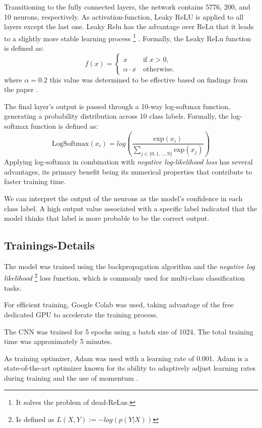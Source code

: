 Transitioning to the fully connected layers, the network contains 5776, 200, and 10 neurons, respectively. As activation-function, Leaky ReLU is applied to all layers except the last one. Leaky Relu has the advantage over ReLu that it leads to a slightly more stable learning process \footnote{It solves the problem of dead-ReLus.} \citep{Maas2013RectifierNI}.
Formally, the Leaky ReLu function is defined as: 
$$
f(x) =
\begin{cases}
x \qquad \ \text{if } x >0, \\ 
\alpha \cdot x \quad \text{otherwise.}
\end{cases}
$$
where $\alpha = 0.2$ this value was determined to be effective based on findings from the paper \citep{xu2015Reluempirical}.

The final layer's output is passed through a 10-way log-softmax function, generating a probability distribution across 10 class labels. Formally, the log-softmax function is defined as: 
$$
\text{LogSoftmax}(x_i) = log(\frac{\text{exp}(x_i)}{\sum_{j \in \{0, 1, ..., 9\}}\text{exp}(x_j)})
$$
Applying log-softmax in combination with \textit{negative log-likelihood loss} has several advantages, its primary benefit being its numerical properties that contribute to faster training time.

We can interpret the output of the neurons as the model's confidence in each class label.
A high output value associated with a specific label indicated that the model thinks that label is more probable to be the correct output.

\subsection{Trainings-Details}

The model was trained using the backpropagation algorithm and the \textit{negative log likelihood} \footnote{Is defined as $L(X, Y) := -log(p(Y | X))$} loss function, which is commonly used for multi-class classification tasks.

For efficient training, Google Colab was used, taking advantage of the free dedicated GPU to  accelerate the training process.

The CNN was trained for 5 epochs using a batch size of 1024.
The total training time was approximately 5 minutes.

As training optimizer, Adam was used with a learning rate of 0.001. Adam is a state-of-the-art optimizer known for its ability to adaptively adjust learning rates during training and the use of momentum \citep{kingma2014adam}.


